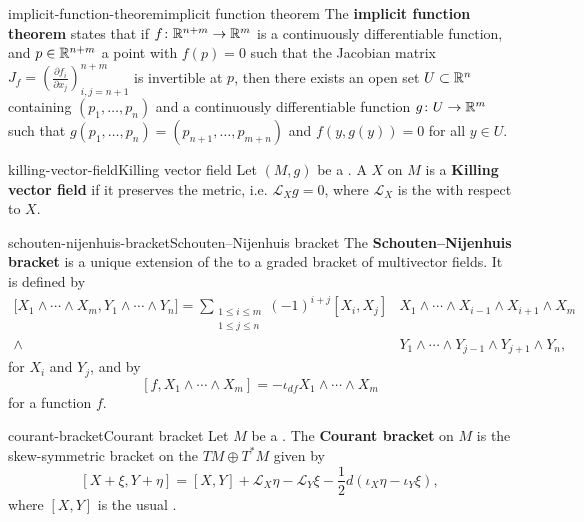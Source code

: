 \begin{topic}{implicit-function-theorem}{implicit function theorem}
    The \textbf{implicit function theorem} states that if $f \colon \mathbb{R}^{n + m} \to \mathbb{R}^m$ is a continuously differentiable function, and $p \in \mathbb{R}^{n + m}$ a point with $f(p) = 0$ such that the Jacobian matrix $J_f = \left(\frac{\partial f_i}{\partial x_j}\right)_{i,j = n + 1}^{n + m}$ is invertible at $p$, then there exists an open set $U \subset \mathbb{R}^n$ containing $(p_1, \ldots, p_n)$ and a continuously differentiable function $g \colon U \to \mathbb{R}^m$ such that $g(p_1, \ldots, p_n) = (p_{n + 1}, \ldots, p_{m + n})$ and $f(y, g(y)) = 0$ for all $y \in U$.
\end{topic}

\begin{topic}{killing-vector-field}{Killing vector field}
    Let $(M, g)$ be a . A  $X$ on $M$ is a \textbf{Killing vector field} if it preserves the metric, i.e. $\mathcal{L}_X g = 0$, where $\mathcal{L}_X$ is the  with respect to $X$.
\end{topic}

\begin{topic}{schouten-nijenhuis-bracket}{Schouten--Nijenhuis bracket}
    The \textbf{Schouten--Nijenhuis bracket} is a unique extension of the  to a graded bracket of multivector fields. It is defined by
    \[ \begin{aligned} {[}X_1 \wedge \cdots \wedge X_m, Y_1 \wedge \cdots \wedge Y_n{]} = \sum_{\substack{1 \le i \le m \\ 1 \le j \le n}} (-1)^{i + j} [X_i, X_j] &X_1 \wedge \cdots \wedge X_{i - 1} \wedge X_{i + 1} \wedge X_m \\ \wedge &Y_1 \wedge \cdots \wedge Y_{j - 1} \wedge Y_{j + 1} \wedge Y_n , \end{aligned} \]
    for  $X_i$ and $Y_j$, and by
    \[ [f, X_1 \wedge \cdots \wedge X_m] = -\iota_{df} X_1 \wedge \cdots \wedge X_m \]
    for a function $f$.
\end{topic}

\begin{topic}{courant-bracket}{Courant bracket}
    Let $M$ be a . The \textbf{Courant bracket} on $M$ is the skew-symmetric bracket on the  $TM \oplus T^*M$ given by
    \[ [X + \xi, Y + \eta] = [X, Y] + \mathcal{L}_X \eta - \mathcal{L}_Y \xi - \frac{1}{2} d \left(\iota_X \eta - \iota_Y \xi \right) , \]
    where $[X, Y]$ is the usual .
\end{topic}

